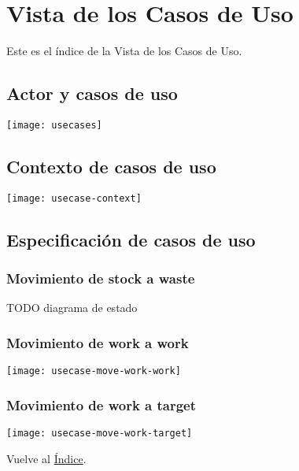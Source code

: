 \newpage
\section{Vista de los Casos de Uso}
Este es el índice de la Vista de los Casos de Uso.

\newpage{}
\subsection{Actor y casos de uso}
\texttt{[image: usecases]}

\newpage{}
\subsection{Contexto de casos de uso}
\texttt{[image: usecase-context]}

\newpage{}
\subsection{Especificación de casos de uso}

\subsubsection{Movimiento de stock a waste}
TODO diagrama de estado

\newpage{}
\subsubsection{Movimiento de work a work}
\texttt{[image: usecase-move-work-work]}

\newpage{}
\subsubsection{Movimiento de work a target}
\texttt{[image: usecase-move-work-target]}

Vuelve al \hyperlink{toc}{Índice}.
